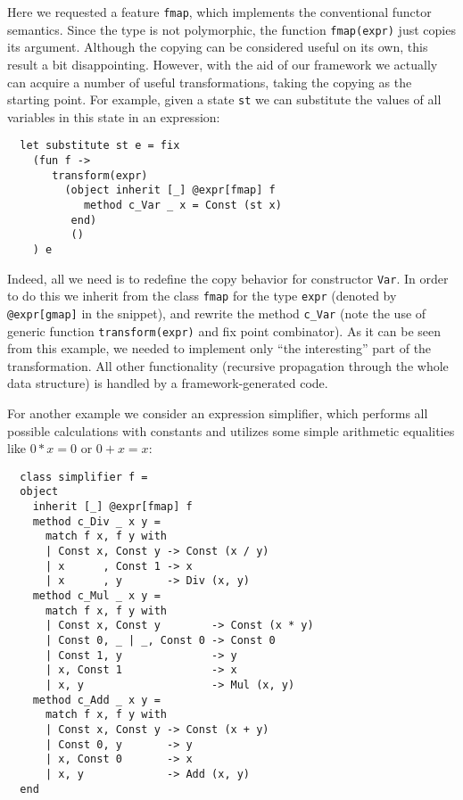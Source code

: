 \documentclass[submission,copyright,creativecommons]{eptcs}
\newcommand{\cd}[1]{\texttt{#1}}
\begin{document}
Here we requested a feature \cd{fmap}, which implements the conventional functor semantics. Since the type is not polymorphic, the function \cd{fmap(expr)}
just copies its argument. Although the copying can be considered useful on its own, this result a bit disappointing. However, with the aid of our framework we
actually can acquire a number of useful transformations, taking the copying as the starting point. For example, given a state \cd{st} we can substitute the
values of all variables in this state in an expression:

\begin{lstlisting}
  let substitute st e = fix
    (fun f ->
       transform(expr)
         (object inherit [_] @expr[fmap] f
            method c_Var _ x = Const (st x)
          end)
          ()
    ) e
\end{lstlisting}

Indeed, all we need is to redefine the copy behavior for constructor \cd{Var}. In order to do this we inherit from the class \cd{fmap} for the type
\cd{expr} (denoted by \cd{@expr[gmap]} in the snippet), and rewrite the method \cd{c\_Var} (note the use of generic function \cd{transform(expr)} and
fix point combinator). As it can be seen from this example, we needed to implement only ``the interesting'' part of the transformation. All other
functionality (recursive propagation through the whole data structure) is handled by a framework-generated code.

For another example we consider an expression simplifier, which performs all possible calculations with constants and utilizes some
simple arithmetic equalities like $0*x=0$ or $0+x=x$:

\begin{lstlisting}
  class simplifier f =
  object 
    inherit [_] @expr[fmap] f
    method c_Div _ x y =
      match f x, f y with
      | Const x, Const y -> Const (x / y)
      | x      , Const 1 -> x
      | x      , y       -> Div (x, y)
    method c_Mul _ x y =
      match f x, f y with
      | Const x, Const y        -> Const (x * y)
      | Const 0, _ | _, Const 0 -> Const 0
      | Const 1, y              -> y
      | x, Const 1              -> x
      | x, y                    -> Mul (x, y)
    method c_Add _ x y =
      match f x, f y with
      | Const x, Const y -> Const (x + y)
      | Const 0, y       -> y
      | x, Const 0       -> x
      | x, y             -> Add (x, y)
  end
\end{lstlisting}
\end{document}
